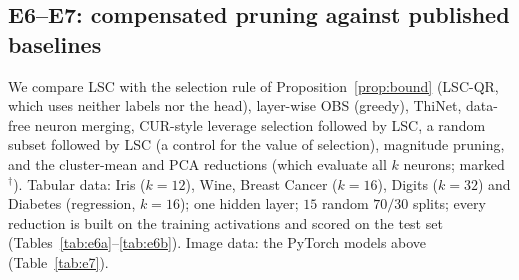 \documentclass[11pt,a4paper]{article}
\theoremstyle{remark}\newtheorem{remark}{Remark}
\begin{document}
\subsection{E6--E7: compensated pruning against published baselines}\label{sec:e6}
We compare LSC with the selection rule of Proposition~\ref{prop:bound} (LSC-QR, which uses neither labels nor the head), layer-wise OBS (greedy), ThiNet, data-free neuron merging, CUR-style leverage selection followed by LSC, a random subset followed by LSC (a control for the value of selection), magnitude pruning, and the cluster-mean and PCA reductions (which evaluate all $k$ neurons; marked $^\dagger$). Tabular data: Iris ($k{=}12$), Wine, Breast Cancer ($k{=}16$), Digits ($k{=}32$) and Diabetes (regression, $k{=}16$); one hidden layer; $15$ random $70/30$ splits; every reduction is built on the training activations and scored on the test set (Tables~\ref{tab:e6a}--\ref{tab:e6b}). Image data: the PyTorch models above (Table~\ref{tab:e7}).
\begin{table}[ht]\centering\small
\caption{Change relative to the full network (mean $\pm$ sd over 15 splits; accuracy points, $R^2$ points for Diabetes) at \textbf{50\%} of the width. Bold: best among methods that reduce the neurons computed. $^\dagger$ evaluates all $k$ neurons.}\label{tab:e6a}

\end{table}
\begin{table}[ht]\centering\small
\caption{As Table~\ref{tab:e6a} at \textbf{25\%} of the width.}\label{tab:e6b}

\end{table}
\begin{table}[ht]\centering\small
\caption{PyTorch models on MNIST (8 seeds): change in test accuracy (points) relative to the full network.}\label{tab:e7}

\end{table}
\end{document}
